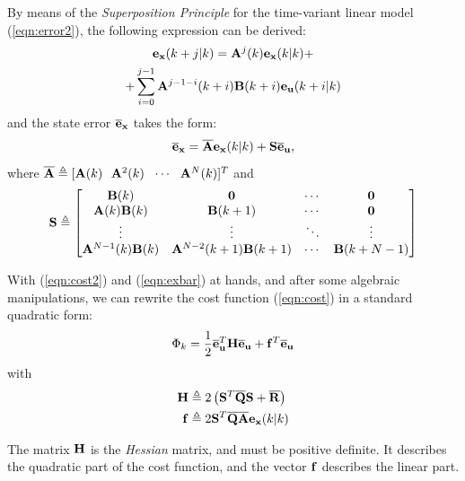 \documentclass[twocolumn]{IEEEtran} %
\begin{document}
By means of the {\em Superposition Principle} for the time-variant linear model (\ref{eqn:error2}), the following expression can be derived:
\begin{multline*}
	{\bf e}_{\bf x}(k+j|k) = {\bf A}^j(k){\bf e}_{\bf x}(k|k) + \\ + \sum_{i=0}^{j-1}{\bf A}^{j-1-i}(k+i){\bf B}(k+i){\bf e}_{\bf u}(k+i|k)
\end{multline*}
and the state error $\overline{\bf e}_{\bf x}$ takes the form:
\begin{equation}\label{eqn:exbar}
	\overline{\bf e}_{\bf x}=\overline{\bf A}{\bf e}_{\bf x}(k|k)+{\bf S}\overline{\bf e}_{\bf u},
\end{equation}
where $\overline{\bf A} \triangleq [{\bf A}(k)~~{\bf A}^2(k)~~\cdots~~{\bf A}^N(k)]^T$ and
{\small
	\begin{equation*}
		{\bf S} \triangleq \begin{bmatrix}
			{\bf B}(k)                 & {\bf 0} 					& \cdots & {\bf 0}       \\
			{\bf A}(k){\bf B}(k)       & {\bf B}(k+1)      			& \cdots & {\bf 0}       \\
			\vdots	                 & \vdots		     		& \ddots & \vdots        \\
			{\bf A}^{N-1}(k){\bf B}(k) & {\bf A}^{N-2}(k+1){\bf B}(k+1) & \cdots & {\bf B}(k+N-1)
		\end{bmatrix}
	\end{equation*}
}

With (\ref{eqn:cost2}) and (\ref{eqn:exbar}) at hands, and after some algebraic manipulations, we can rewrite the cost function (\ref{eqn:cost}) in a standard quadratic form:
\begin{equation}
	\Phi_k = \frac{1}{2}\overline{\bf e}_{\bf u}^T{\bf H}\overline{\bf e}_{\bf u} + {\bf f}^T\overline{\bf e}_{\bf u}
\end{equation}
with
\begin{align*}
	{\bf H} &\triangleq 2\left({\bf S}^T\overline{\bf Q}{\bf S}+\overline{\bf R}\right) \\
	{\bf f} &\triangleq 2{\bf S}^T\overline{\bf Q}\overline{\bf A}{\bf e}_{\bf x}(k|k)
\end{align*}

The matrix ${\bf H}$ is the {\em Hessian} matrix, and must be positive definite. It describes the quadratic part of the cost function, and the vector ${\bf f}$ describes the linear part. 
\end{document}
